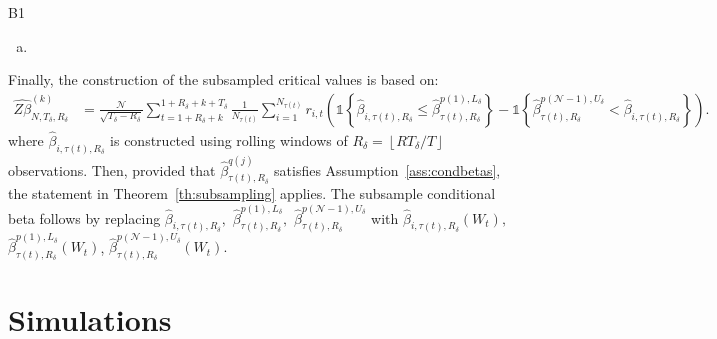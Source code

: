 \begin{namedtheorem}{B1}
\begin{enumerate}[(i)]
\begin{enumerate}[(a)]
        \item \hspace*{-\leftmargin}%
    \end{enumerate}
\end{enumerate}
\end{namedtheorem}

Finally, the construction of the subsampled critical values is based on: 
\begin{align*}
    \widehat{Z\beta}_{N,T_\delta,R_\delta}^{(k)} &= \frac{\mathcal{N}}{\sqrt{T_\delta - R_\delta}} \sum_{t=1+R_\delta+k}^{1+R_\delta+k+T_\delta}\frac{1}{N_{\tau(t)}}\sum_{i=1}^{N_{\tau(t)}}r_{i,t}\left( \mathds{1}\left\{ \widehat{\beta}_{i,\tau(t),R_\delta}\leq \widehat{\beta}_{\tau(t) ,R_\delta}^{p(1), L_\delta}\right\} - \mathds{1}\left\{ \widehat{\beta}_{\tau(t), R_\delta}^{p(\mathcal{N}-1), U_\delta} < \widehat{\beta}_{i,\tau(t), R_\delta} \right\} \right). 
\end{align*}
where $\widehat{\beta}_{i,\tau(t),R_{\delta }}$ is constructed using rolling windows of $R_\delta = \left\lfloor R T_\delta / T \right\rfloor$ observations. Then, provided that $\widehat{\beta }_{\tau(t),R_{\delta }}^{q(j)}$ satisfies Assumption~\ref{ass:condbetas}, the statement in Theorem~\ref{th:subsampling} applies. The subsample conditional beta follows by replacing $\widehat{\beta }_{i,\tau(t),R_{\delta }},$ $\widehat{\beta }_{\tau(t),R_{\delta }}^{p(1),L_{\delta }},$ $\widehat{\beta }_{\tau(t),R_{\delta }}^{p(\mathcal{N}-1),U_{\delta }}$ with $\widehat{\beta }_{i,\tau(t),R_{\delta }}\left( W_t\right) ,$ $\widehat{\beta }_{\tau(t),R_{\delta }}^{p(1),L_{\delta}}\left( W_t\right)$, $\widehat{\beta }_{\tau(t),R_{\delta }}^{p(\mathcal{N} -1),U_{\delta }}\left(W_t\right) .$



\section{Simulations}
\label{Simulations}


